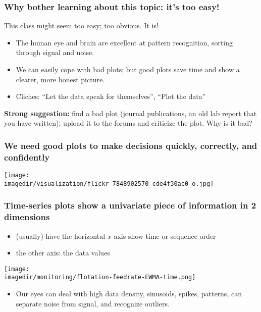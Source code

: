 \begin{frame}\frametitle{Why bother learning about this topic: it's too easy!}
	
	This class might seem too easy; too obvious. It is!
	\begin{itemize}
		\item	The human eye and brain are excellent at pattern recognition, sorting through signal and noise.
		\item	We can easily cope with bad plots; but good plots save time and show a clearer, more honest picture.   \pause 
		\item	Cliches: ``Let the data speak for themselves'', ``Plot the data'' 
	\end{itemize}
	 \pause 
	
	\vspace{12pt}
	\begin{exampleblock}{}
		{\color{myGreen}\textbf{Strong suggestion:}} find a bad plot (journal publications, an old lab report that you have written); upload it to the forums and criticize the plot. Why is it bad?
	\end{exampleblock}
	
\end{frame}

\begin{frame}\frametitle{We need good plots to make decisions quickly, correctly, and confidently} 
	
	\vspace{6pt}
	\centerline{\texttt{[image: \\imagedir/visualization/flickr-7848902570\_cde4f30ac0\_o.jpg]}}
	
	
\end{frame}

\begin{frame}\frametitle{Time-series plots show a univariate piece of information in 2 dimensions}
		\begin{itemize}
			\item	(usually) have the horizontal $x$-axis show time or sequence order 
			\item	the other axis: the data values 
		\end{itemize}
		\centerline{\texttt{[image: \\imagedir/monitoring/flotation-feedrate-EWMA-time.png]}}
	\pause
	\begin{itemize}
		\item	Our eyes can deal with high data density, sinusoids, spikes, patterns, can separate noise from signal, and recognize outliers.
	\end{itemize}
\end{frame}

